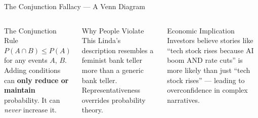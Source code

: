 \documentclass[aspectratio=169]{beamer}
\begin{document}
\begin{frame}{The Conjunction Fallacy --- A Venn Diagram}
\begin{columns}
\begin{block}{The Conjunction Rule}
$P(A \cap B) \leq P(A)$ for any events $A$, $B$.\\[0.4em]
Adding conditions can \textbf{only reduce or maintain} probability. It can \textit{never} increase it.
\end{block}
\begin{alertblock}{Why People Violate This}
Linda's description \alert{resembles} a feminist bank teller more than a generic bank teller. Representativeness overrides probability theory.
\end{alertblock}
\begin{exampleblock}{Economic Implication}
Investors believe stories like ``tech stock rises because AI boom AND rate cuts'' is more likely than just ``tech stock rises'' --- leading to overconfidence in complex narratives.
\end{exampleblock}
\end{columns}
\end{frame}
\end{document}
